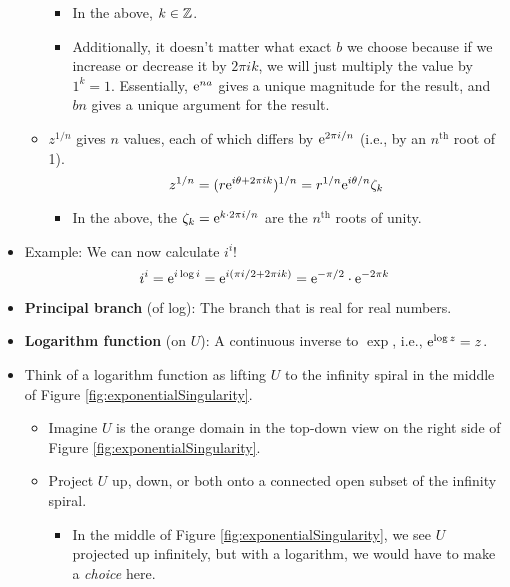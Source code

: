 \documentclass[../notes.tex]{subfiles}
\begin{document}
\begin{itemize}
\begin{itemize}
\begin{itemize}
            \item In the above, $k\in\Z$.
            \item Additionally, it doesn't matter what exact $b$ we choose because if we increase or decrease it by $2\pi ik$, we will just multiply the value by $1^k=1$. Essentially, $\e[na]$ gives a unique magnitude for the result, and $bn$ gives a unique argument for the result.
        \end{itemize}
        \item $z^{1/n}$ gives $n$ values, each of which differs by $\e[2\pi i/n]$ (i.e., by an $n^\text{th}$ root of 1).
        \begin{equation*}
            z^{1/n} = (r\e[i\theta+2\pi ik])^{1/n}
            = r^{1/n}\e[i\theta/n]\zeta_k
        \end{equation*}
        \begin{itemize}
            \item In the above, the $\zeta_k=\e[k\cdot 2\pi i/n]$ are the $n^\text{th}$ roots of unity.
        \end{itemize}
    \end{itemize}
    \item Example: We can now calculate $i^i$!
    \begin{equation*}
        i^i = \e[i\log i]
        = \e[i(\pi i/2+2\pi ik)]
        = \e[-\pi/2]\cdot\e[-2\pi k]
    \end{equation*}
    \item \textbf{Principal branch} (of log): The branch that is real for real numbers.
    \item \textbf{Logarithm function} (on $U$): A continuous inverse to $\exp$, i.e., $\e[\log z]=z$.
    \item Think of a logarithm function as lifting $U$ to the infinity spiral in the middle of Figure \ref{fig:exponentialSingularity}.
    \begin{itemize}
        \item Imagine $U$ is the orange domain in the top-down view on the right side of Figure \ref{fig:exponentialSingularity}.
        \item Project $U$ up, down, or both onto a connected open subset of the infinity spiral.
        \begin{itemize}
            \item In the middle of Figure \ref{fig:exponentialSingularity}, we see $U$ projected up infinitely, but with a logarithm, we would have to make a \emph{choice} here.
        \end{itemize}

\end{itemize}
\end{itemize}
\end{document}
